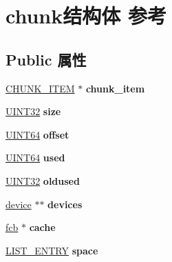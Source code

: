 \hypertarget{structchunk}{}\section{chunk结构体 参考}
\label{structchunk}
\subsection*{Public 属性}
\begin{DoxyCompactItemize}
\item 
\mbox{\label{structchunk_ae2541fb4a68bde33e5b85f9fc5ef77f1}} 
\hyperlink{struct_c_h_u_n_k___i_t_e_m}{C\+H\+U\+N\+K\+\_\+\+I\+T\+EM} $\ast$ {\bfseries chunk\+\_\+item}
\item 
\mbox{\label{structchunk_a2f28772d8f872e0469fed4764dae6176}} 
\hyperlink{_processor_bind_8h_ae1e6edbbc26d6fbc71a90190d0266018}{U\+I\+N\+T32} {\bfseries size}
\item 
\mbox{\label{structchunk_a4ff4e25b76deb07816d2dbc92a0fcb69}} 
\hyperlink{_processor_bind_8h_a57be03562867144161c1bfee95ca8f7c}{U\+I\+N\+T64} {\bfseries offset}
\item 
\mbox{\label{structchunk_a7d958a750cf0f75518975ef4dc466d94}} 
\hyperlink{_processor_bind_8h_a57be03562867144161c1bfee95ca8f7c}{U\+I\+N\+T64} {\bfseries used}
\item 
\mbox{\label{structchunk_ae2e1f5883bffe0c5c6f4f2856aca7d63}} 
\hyperlink{_processor_bind_8h_ae1e6edbbc26d6fbc71a90190d0266018}{U\+I\+N\+T32} {\bfseries oldused}
\item 
\mbox{\label{structchunk_a64eb8bc9da3c5f28177620666a1bc492}} 
\hyperlink{structdevice}{device} $\ast$$\ast$ {\bfseries devices}
\item 
\mbox{\label{structchunk_a4127cf1f6eeac0e0d7cff7564057be77}} 
\hyperlink{struct__fcb}{fcb} $\ast$ {\bfseries cache}
\item 
\mbox{\label{structchunk_afa980ee3064d842107cd6b0035e0d90e}} 
\hyperlink{struct___l_i_s_t___e_n_t_r_y}{L\+I\+S\+T\+\_\+\+E\+N\+T\+RY} {\bfseries space}
\item 
$$
\end{DoxyCompactItemize}
